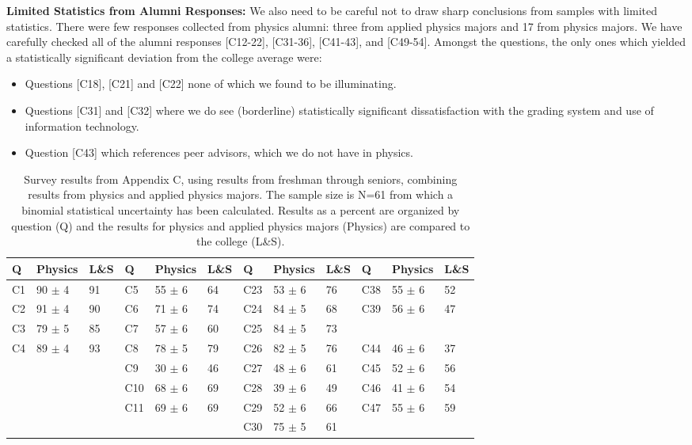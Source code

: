 \documentclass[12pt]{article}
\begin{document}
\noindent
{\bf Limited Statistics from Alumni Responses:} We also need to be
careful not to draw sharp conclusions from samples with limited
statistics.  There were few responses collected from physics alumni:
three from applied physics majors and 17 from physics majors.  We have
carefully checked all of the alumni responses [C12-22], [C31-36],
[C41-43], and [C49-54].  Amongst the questions, the only ones which
yielded a statistically significant deviation from the college average
were:
\begin{itemize}
  \item Questions [C18], [C21] and [C22] none of which we found to be
    illuminating.
  \item Questions [C31] and [C32] where we do see (borderline)
    statistically significant dissatisfaction with the grading system
    and use of information technology.
  \item Question [C43] which references peer advisors, which we do not
    have in physics.
\end{itemize}

\begin{table}[htbp]
\caption{\label{tbl:appc} Survey results from Appendix C, using
  results from freshman through seniors, combining results from
  physics and applied physics majors. The sample size is N=61 from
  which a binomial statistical uncertainty has been calculated.
  Results as a percent are organized by question (Q) and the results
  for physics and applied physics majors (Physics) are compared to the
  college (L\&S).}
\begin{center}
\begin{tabular}{|lll|lll|lll|lll|}
\hline
Q & Physics & L\&S & Q & Physics & L\&S & Q & Physics & L\&S & Q & Physics & L\&S \\
\hline
C1 & 90 $\pm$ 4 & 91 & C5  & 55 $\pm$ 6 & 64 & C23 & 53 $\pm$ 6 & 76 & C38 & 55 $\pm$ 6 & 52 \\
C2 & 91 $\pm$ 4 & 90 & C6  & 71 $\pm$ 6 & 74 & C24 & 84 $\pm$ 5 & 68 & C39 & 56 $\pm$ 6 & 47 \\
C3 & 79 $\pm$ 5 & 85 & C7  & 57 $\pm$ 6 & 60 & C25 & 84 $\pm$ 5 & 73 &     &            &    \\                  
C4 & 89 $\pm$ 4 & 93 & C8  & 78 $\pm$ 5 & 79 & C26 & 82 $\pm$ 5 & 76 & C44 & 46 $\pm$ 6 & 37 \\
~  &            &    & C9  & 30 $\pm$ 6 & 46 & C27 & 48 $\pm$ 6 & 61 & C45 & 52 $\pm$ 6 & 56 \\
~  &            &    & C10 & 68 $\pm$ 6 & 69 & C28 & 39 $\pm$ 6 & 49 & C46 & 41 $\pm$ 6 & 54 \\
~  &            &    & C11 & 69 $\pm$ 6 & 69 & C29 & 52 $\pm$ 6 & 66 & C47 & 55 $\pm$ 6 & 59 \\
~  &            &    &     &            &    & C30 & 75 $\pm$ 5 & 61 &     &            &    \\
\hline 
\end{tabular}
\end{center}
\end{table}
\end{document}
